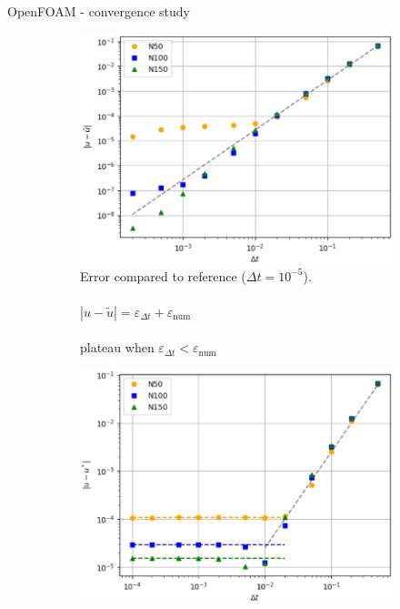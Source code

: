 \documentclass[
  english,            %
  aspectratio=43,    %
]{tumbeamer}
\begin{document}
\begin{frame}{OpenFOAM - convergence study}
\vspace*{\fill}
\begin{figure}[!htbp]
    \centering
    \begin{subfigure}[b]{0.49\textwidth}
      \includegraphics[width=\textwidth]{resources/ref_error_openfoam.png}
      \caption{
        Error compared to reference ($\Delta t = 10^{-5}$). \\ \\
        $|u - \tilde{u}| = \varepsilon_{\Delta t} + \varepsilon_\text{num}$ \\ \\
        plateau when $\varepsilon_{\Delta t} < \varepsilon_\text{num}$
      }
      \label{fig:convergence_openfoam}
    \end{subfigure}
    \hspace{1pt}
    \begin{subfigure}[b]{0.49\textwidth}
        \includegraphics[width=\textwidth]{resources/analytic_error_openfoam.png}

\end{subfigure}
\end{figure}
\end{frame}
\end{document}

